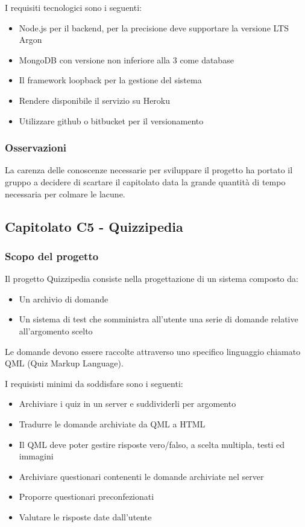 I  requisiti tecnologici sono i seguenti:
\begin{itemize}
	\item Node.js per il backend, per la precisione deve supportare la versione LTS Argon
	\item MongoDB con versione non inferiore alla 3 come database
	\item Il framework loopback per la gestione del sistema
	\item Rendere disponibile il servizio su Heroku
	\item Utilizzare github o bitbucket per il versionamento
\end{itemize}

\subsubsection{Osservazioni}
La carenza delle conoscenze necessarie per sviluppare il progetto ha portato il gruppo a decidere di scartare il capitolato data la grande quantità
di tempo necessaria per colmare le lacune.


\subsection{Capitolato C5 - Quizzipedia}
\subsubsection{Scopo del progetto}

Il progetto Quizzipedia consiste nella progettazione di un sistema composto da:
\begin{itemize}
	\item Un archivio di domande
	\item Un sistema di test che somministra all'utente una serie di domande relative all'argomento scelto
\end{itemize}
Le domande devono essere raccolte attraverso uno specifico linguaggio chiamato QML (Quiz Markup Language).

I requisisti minimi da soddisfare sono i seguenti:
\begin{itemize}
	\item Archiviare i quiz in un server e suddividerli per argomento
	\item Tradurre le domande archiviate da QML a HTML
	\item Il QML deve poter gestire risposte vero/falso, a scelta multipla, testi ed immagini
	\item Archiviare questionari contenenti le domande archiviate nel server
	\item Proporre questionari preconfezionati
	\item Valutare le risposte date dall'utente
\end{itemize}

